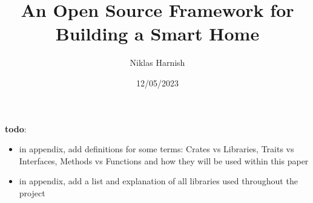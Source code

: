 \documentclass{LULCSProject}
\title{An Open Source Framework for Building a Smart Home}
\author{Niklas Harnish}
\date{12/05/2023}
\begin{document}
\maketitle


\newpage
\listoffigures
\newpage
\listoftables

\newpage
\textbf{todo}:
\begin{itemize}
    \item in appendix, add definitions for some terms: Crates vs Libraries, Traits vs Interfaces, Methods vs Functions and how they will be used within this paper
    \item in appendix, add a list and explanation of all libraries used throughout the project
\end{itemize}

\pagebreak
{}



\newpage


\newpage


\newpage


\newpage


\newpage


\newpage


\newpage
\appendix

\newpage

\newpage 

\end{document}

